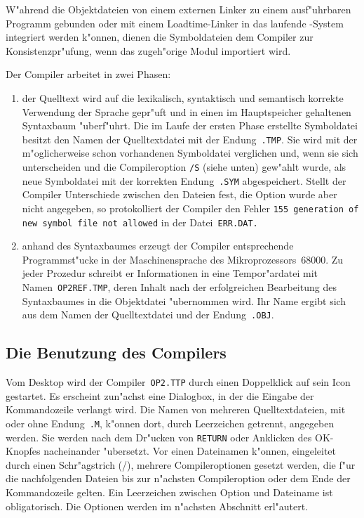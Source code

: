 W"ahrend die Objektdateien von einem externen Linker zu einem ausf"uhrbaren
Programm gebunden oder mit einem Loadtime-Linker in das
laufende \oberon-System integriert werden k"onnen, dienen die Symboldateien
dem Compiler zur Konsistenzpr"ufung, wenn das zugeh"orige Modul importiert
wird.

Der Compiler arbeitet in zwei Phasen:
\begin{enumerate}
\item der Quelltext wird auf die lexikalisch, syntaktisch und
  semantisch korrekte Verwendung der Sprache gepr"uft und in einen im
  Hauptspeicher gehaltenen Syntaxbaum "uberf"uhrt.
  Die im Laufe der ersten Phase erstellte Symboldatei besitzt den Namen der
  Quelltextdatei mit der Endung~{\tt .TMP}.
  Sie wird mit der m"oglicherweise schon vorhandenen Symboldatei verglichen
  und, wenn sie sich unterscheiden und die Compileroption {\tt /S} (siehe unten)
  gew"ahlt wurde, als neue Symboldatei mit der korrekten Endung~{\tt .SYM}
  abgespeichert.
  Stellt der Compiler Unterschiede zwischen den Dateien fest, die Option
  wurde aber nicht angegeben, so protokolliert der Compiler den Fehler
  {\tt 155 generation of new symbol file not allowed} in der Datei~{\tt ERR.DAT.}
\item anhand des Syntaxbaumes erzeugt der Compiler entsprechende
  Programmst"ucke in der Maschinensprache des Mikroprozessors~68000.
  Zu jeder Prozedur schreibt er Informationen in eine Tempor"ardatei mit
  Namen~{\tt OP2REF.TMP}, deren Inhalt nach der erfolgreichen Bearbeitung des
  Syntaxbaumes in die Objektdatei "ubernommen wird.
  Ihr Name ergibt sich aus dem Namen der Quelltextdatei und der Endung~{\tt .OBJ}.
\end{enumerate}

\subsection{Die Benutzung des Compilers}

Vom Desktop wird der Compiler~{\tt OP2.TTP} durch einen Doppelklick auf sein
Icon gestartet.
Es erscheint zun"achst eine Dialogbox, in der die Eingabe der Kommandozeile
verlangt wird.
Die Namen von mehreren Quelltextdateien, mit oder ohne Endung~{\tt .M},
k"onnen dort, durch Leerzeichen getrennt, angegeben werden.
Sie werden nach dem Dr"ucken von {\tt RETURN} oder Anklicken des OK-Knopfes
nacheinander "ubersetzt.
Vor einen Dateinamen k"onnen, eingeleitet durch einen Schr"agstrich (/),
mehrere Compileroptionen gesetzt werden, die f"ur die nachfolgenden
Dateien bis zur n"achsten Compileroption oder dem Ende der Kommandozeile
gelten.
Ein Leerzeichen zwischen Option und Dateiname ist obligatorisch.
Die Optionen werden im n"achsten Abschnitt erl"autert.

